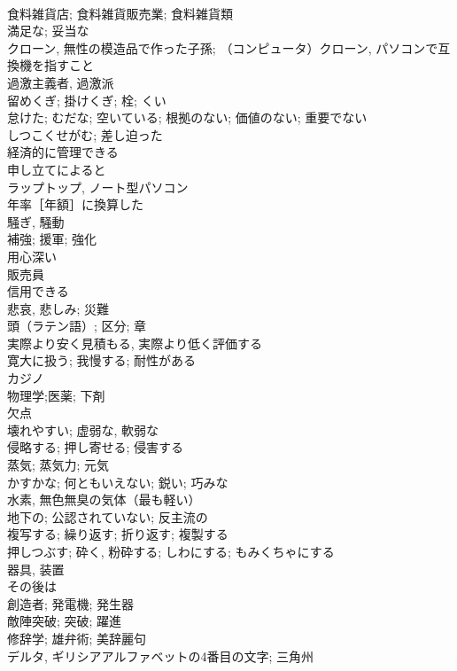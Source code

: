 \documentclass[8pt]{extreport}
\begin{document}
\begin{CJK}{UTF8}{min}
\\	食料雑貨店; 食料雑貨販売業; 食料雑貨類	
\\	満足な; 妥当な	
\\	クローン, 無性の模造品で作った子孫; （コンピュータ）クローン, パソコンで互換機を指すこと	
\\	過激主義者, 過激派	
\\	留めくぎ; 掛けくぎ; 栓; くい	
\\	怠けた; むだな; 空いている; 根拠のない; 価値のない; 重要でない	
\\	しつこくせがむ; 差し迫った	
\\	経済的に管理できる	
\\	申し立てによると	
\\	ラップトップ, ノート型パソコン	
\\	年率［年額］に換算した	
\\	騒ぎ, 騒動	
\\	補強; 援軍; 強化	
\\	用心深い	
\\	販売員	
\\	信用できる	
\\	悲哀, 悲しみ; 災難	
\\	頭（ラテン語）; 区分; 章	
\\	実際より安く見積もる, 実際より低く評価する	
\\	寛大に扱う; 我慢する; 耐性がある	
\\	カジノ	
\\	物理学;医薬; 下剤	
\\	欠点	
\\	壊れやすい; 虚弱な, 軟弱な	
\\	侵略する; 押し寄せる; 侵害する	
\\	蒸気; 蒸気力; 元気	
\\	かすかな; 何ともいえない; 鋭い; 巧みな	
\\	水素, 無色無臭の気体（最も軽い）	
\\	地下の; 公認されていない; 反主流の	
\\	複写する; 繰り返す; 折り返す; 複製する	
\\	押しつぶす; 砕く, 粉砕する; しわにする; もみくちゃにする	
\\	器具, 装置	
\\	その後は	
\\	創造者; 発電機; 発生器	
\\	敵陣突破; 突破; 躍進	
\\	修辞学; 雄弁術; 美辞麗句	
\\	デルタ, ギリシアアルファベットの4番目の文字; 三角州	

\end{CJK}
\end{document}

